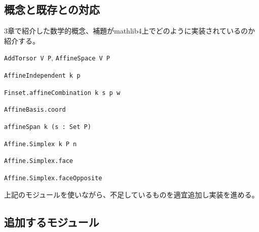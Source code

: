 \documentclass[a4paper,12pt]{bxjsbook}
\newlength{\customindent}
\newenvironment{body}{
  \par
  \begingroup
  \setlength{\leftskip}{\customindent}
  \setlength{\rightskip}{0pt}
  \setlength{\parindent}{1em}
  \setlength{\displayindent}{\customindent}
  \setlength{\displaywidth}{\dimexpr\linewidth-\customindent\relax}
}{
  \par
  \endgroup
}
\theoremstyle{theorem}
\begin{document}
    \subsection{概念と既存との対応}
    \begin{body}
        \indent $3$章で紹介した数学的概念、補題がmathlib4上でどのように実装されているのか紹介する。
        \begin{bodydescription}[style=nextline,leftmargin=4.5em,labelsep=1em,font=\normalfont\bfseries,itemsep=0pt, topsep=2pt, parsep=0pt]
          \item[アフィン空間] \nolinkurl{AddTorsor V P}, \nolinkurl{AffineSpace V P}
          \item[アフィン独立] \nolinkurl{AffineIndependent k p}
          \item[アフィン結合] \nolinkurl{Finset.affineCombination k s p w}
          \item[重心座標] \nolinkurl{AffineBasis.coord}
          \item[アフィン包] \nolinkurl{affineSpan k (s : Set P)}
          \item[凸包] %
          \item[単体] \nolinkurl{Affine.Simplex k P n}
          \item[面] \nolinkurl{Affine.Simplex.face}
          \item[対向面] \nolinkurl{Affine.Simplex.faceOpposite}
        \end{bodydescription}

        \indent 上記のモジュールを使いながら、不足しているものを適宜追加し実装を進める。
    \end{body}

    \subsection{追加するモジュール}
    \begin{body}
        
    \end{body}


\end{document}

